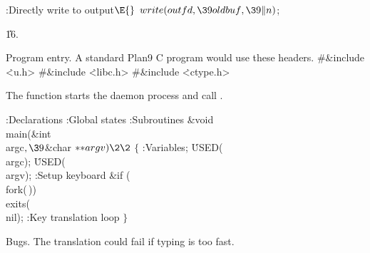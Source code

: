 \B{}:Directly write to output\X${}\E{}$\6
$\\{write}(\\{outfd},\39\\{oldbuf},\39\|n){}$;\par
\U16.\fi

Program entry. A standard Plan9 C program would use these headers.
\Y\B\8\#\&{include} \.{<u.h>}\6
\8\#\&{include} \.{<libc.h>}\6
\8\#\&{include} \.{<ctype.h>}\par
\fi

The  function starts the daemon process and call .

\Y\B{}:Declarations\X\6
:Global states\X\6
:Subroutines\X\7
\1\1\&{void} \\{main}(\&{int} \\{argc}${},\39{}$\&{char} ${}{*}{*}\\{argv})\2%
\2{}$\6
${}\{{}$\1\6
:Variables\X;\6
\.{USED}(\\{argc});\6
\.{USED}(\\{argv});\6
:Setup keyboard\X\6
\&{if} (\\{fork}(\,))\1\5
\\{exits}(\\{nil});\2\6
:Key translation loop\X\6
\4${}\}{}$\2\par
\fi

Bugs. The translation could fail if typing is too fast.
\fi

\inx
\fin
\con
